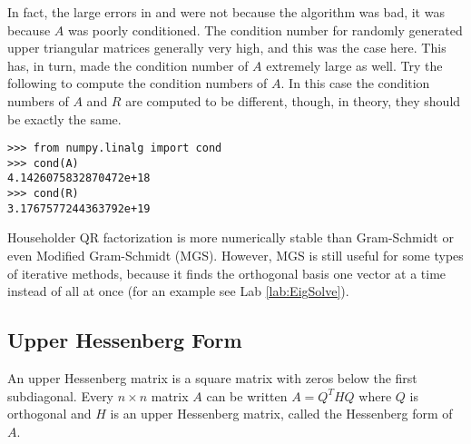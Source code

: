 In fact, the large errors in  and  were not because the algorithm was bad, it was because $A$ was poorly conditioned.
The condition number for randomly generated upper triangular matrices generally very high, and this was the case here.
This has, in turn, made the condition number of $A$ extremely large as well.
Try the following to compute the condition numbers of $A$.
In this case the condition numbers of $A$ and $R$ are computed to be different, though, in theory, they should be exactly the same.
\begin{lstlisting}
>>> from numpy.linalg import cond
>>> cond(A)
4.1426075832870472e+18
>>> cond(R)
3.1767577244363792e+19
\end{lstlisting}

Householder QR factorization is more numerically stable than Gram-Schmidt or even Modified Gram-Schmidt (MGS).
However, MGS is still useful for some types of iterative methods, because it finds the orthogonal basis one vector at a time instead of all at once (for an example see Lab \ref{lab:EigSolve}).

\subsection*{Upper Hessenberg Form}
An upper Hessenberg matrix is a square matrix with zeros below the first subdiagonal.
Every  $n \times n$ matrix $A$ can be written $A = Q^THQ$ where $Q$ is orthogonal and $H$ is an upper Hessenberg matrix, called the Hessenberg form of $A$.

